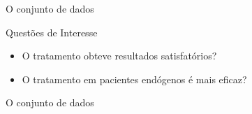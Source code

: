\begin{frame}{O conjunto de dados}
	\begin{block}{Questões de Interesse}
		\begin{itemize}
			\item O tratamento obteve resultados satisfatórios?
			\item O tratamento em pacientes endógenos é mais eficaz?
		\end{itemize}
	\end{block}
\end{frame}


\begin{frame}{O conjunto de dados}
	\begin{table}[ht]
		\centering
		\caption{Escore HDRS dos pacientes em cada semana de tratamento.}
	\end{table}
	
\end{frame}



